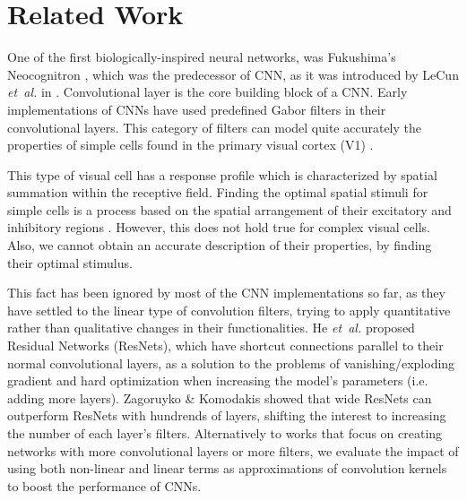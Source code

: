 \documentclass[10pt,twocolumn,letterpaper]{article}
\begin{document}
\section{Related Work}
\label{RelWork}

     One of the first biologically-inspired neural networks, was Fukushima's Neocognitron \cite{Fukushima80}, which was the predecessor of CNN, as it was introduced by LeCun \textit{et~al.} in \cite{LeCun90}. Convolutional layer is the core building block of a CNN. Early implementations of CNNs have used predefined Gabor filters in their convolutional layers. This category of filters can model quite accurately the properties of simple cells found in the primary visual cortex (V1) \cite{Marcelja80}.
     
     This type of visual cell has a response profile which is characterized by spatial summation within the receptive field. Finding the optimal spatial stimuli \cite{Foldiak01} for simple cells is a process based on the spatial arrangement of their excitatory and inhibitory regions \cite{Movshon78}. However, this does not hold true for complex visual cells. Also, we cannot obtain an accurate description of their properties, by finding their optimal stimulus.
     
     This fact has been ignored by most of the CNN implementations so far, as they have settled to the linear type of convolution filters, trying to apply quantitative rather than qualitative changes in their functionalities.  He \textit{et~al.} \cite{He15} proposed Residual Networks (ResNets), which have shortcut connections parallel to their normal convolutional layers, as a solution to the problems of vanishing/exploding gradient and hard optimization when increasing the model's parameters (i.e. adding more layers).
     Zagoruyko \& Komodakis \cite{WRN16} showed that wide ResNets can outperform ResNets with hundrends of layers, shifting the interest to increasing the number of each layer's filters. Alternatively to works that focus on creating networks with more convolutional layers or more filters, we evaluate the impact of using both non-linear and linear terms as approximations of convolution kernels to boost the performance of CNNs.
     
\end{document}
